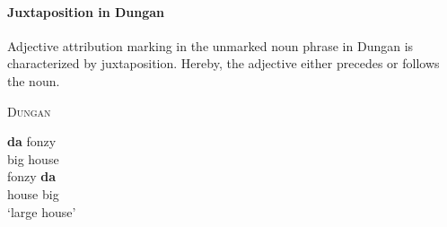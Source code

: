 \paragraph{Juxtaposition in Dungan}
Adjective attribution marking in the unmarked noun phrase in Dungan is characterized by juxtaposition. Hereby, the adjective either precedes or follows the noun.
\begin{exe}
\ex \textsc{Dungan} \cite[480]{kalimov1968} \label{dungan juxtap}
\begin{xlist}
\ex 	
\gll	\textbf{da} fonzy\\
	big house\\
\ex
\gll	fonzy \textbf{da}\\
	house big\\
\glt	‘large house’
\end{xlist}
\end{exe}

